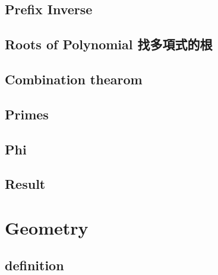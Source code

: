 \documentclass[a4paper,10pt,twocolumn,oneside]{article}
\begin{document}
\subsection{Prefix Inverse}


\subsection{Roots of Polynomial 找多項式的根}


\subsection{Combination thearom}


% 

%

\subsection{Primes}


\subsection{Phi}


\subsection{Result}


\section{Geometry}

% 

\subsection{definition}

\end{document}
